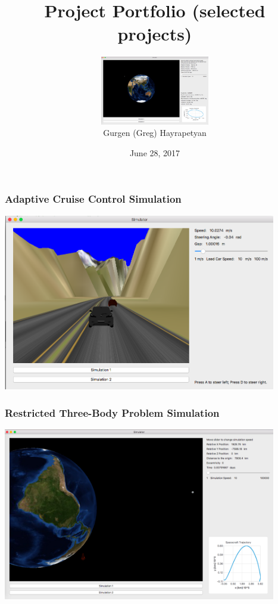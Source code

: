 \documentclass[mathserif]{beamer}
\title{Project Portfolio (selected projects)}
\author{}
\institute{
}
\date{June 28, 2017}
\author[Gurgen Hayrapetyan]{
\includegraphics[height=3cm]{sat3.png}\\
Gurgen (Greg) Hayrapetyan}
\begin{document}
\begin{frame}
\titlepage
\end{frame}


%
%
%
%
%
%
%
%
%
%
%
%

\begin{frame}
\frametitle{Adaptive Cruise Control Simulation}

\includegraphics[width=4.7in]{SimulatorScreenShot.png}

\end{frame}

\begin{frame}
\frametitle{Restricted Three-Body Problem Simulation}

\includegraphics[width=4.7in]{Restricted3Body.png}


\end{frame}
\end{document}

